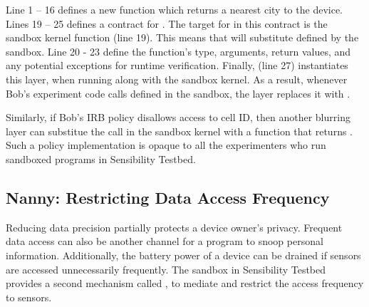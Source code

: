 Line 1 -- 16 defines a new function  which returns 
a nearest city to the device. 
Lines 19 -- 25 defines a contract for . 
The target for  in this
contract is the sandbox kernel function  (line 19).
This means that  will substitute  
 defined by the sandbox.
Line 20 - 23 define the function's type, arguments,
return values, and any potential exceptions for runtime verification. 
Finally,  (line 27) instantiates this
 layer, when running along with the sandbox kernel. 
As a result, 
whenever Bob's experiment code calls  defined in the sandbox, 
the  layer replaces it with . 

Similarly, if Bob's IRB policy disallows access to cell ID, then another blurring layer 
can substitue the  call in the sandbox kernel with a function that
returns . %
Such a policy implementation is opaque to all the experimenters who run 
sandboxed programs in Sensibility Testbed.

\subsection{Nanny: Restricting Data Access Frequency}\label{sec-nanny}

Reducing data precision partially protects a device owner's privacy. Frequent data 
access can also be another channel for a program to snoop personal information.
Additionally, the battery power of a device can be drained if sensors are accessed
unnecessarily frequently. The sandbox in Sensibility Testbed provides a second mechanism
called , to mediate and restrict the access frequency to sensors. 

